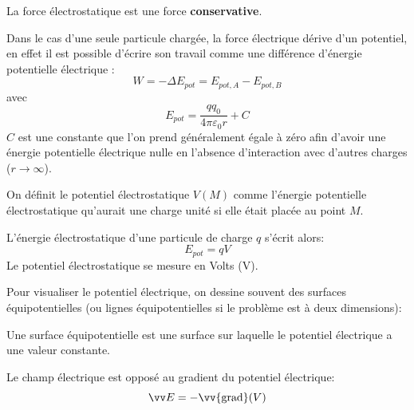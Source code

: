 \documentclass[11pt,fleqn]{book} %
\begin{document}
\begin{proposition}
    La force électrostatique est une force \textbf{conservative}.
\end{proposition}

Dans le cas d'une seule particule chargée, la force électrique dérive d'un potentiel, en effet il est possible d'écrire son travail comme une différence d'énergie potentielle électrique :
\begin{equation}
    W = - \Delta E_{pot} =  E_{pot,A} - E_{pot,B}
\end{equation}
avec
\begin{equation}
    E_{pot} = \frac{q q_0}{4 \pi \varepsilon_0 r} + C
\end{equation}
$C$ est une constante que l'on prend généralement égale à zéro afin d'avoir une énergie potentielle électrique nulle en l'absence d'interaction avec d'autres charges ($r \to \infty$).

\begin{definition}
    On définit le potentiel électrostatique $V(M)$ comme l'énergie potentielle électrostatique qu'aurait une charge unité si elle était placée au point $M$.
    
    L'énergie électrostatique d'une particule de charge $q$ s'écrit alors:
    \begin{equation}
        E_{pot} = q V
    \end{equation}
    Le potentiel électrostatique se mesure en Volts (V).
\end{definition}

Pour visualiser le potentiel électrique, on dessine souvent des surfaces équipotentielles (ou lignes équipotentielles si le problème est à deux dimensions):
\begin{definition}
    Une surface équipotentielle est une surface sur laquelle le potentiel électrique a une valeur constante.
\end{definition}

\begin{proposition}
    Le champ électrique est opposé au gradient du potentiel électrique:
    \begin{equation}
    \vv E = -\vv{\mathrm{grad}}(V)
    \end{equation}
\end{proposition}
\end{document}
